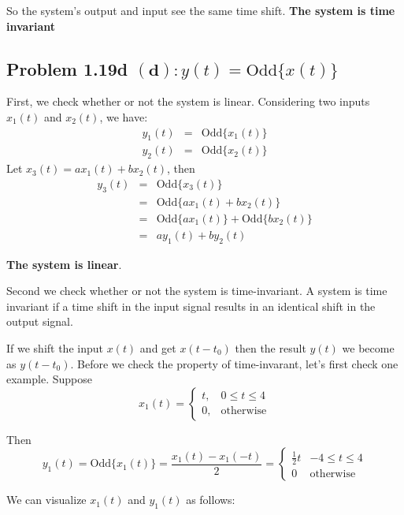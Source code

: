 \documentclass[koma,a4paper,utopia,12pt,listings-color,microtype,paralist,colorlinks,urlcolor=red]{org-article}
\begin{document}
So the system's output and input see the same time shift. \textbf{The system is time
invariant}

\subsection{Problem 1.19d \(\mathbf{(d)}: y(t)= \mathrm{Odd}\{ x(t) \}\)}
\label{sec:org4f05b22}

First, we check whether or not the system is linear. Considering two inputs
\(x_{1}(t)\) and \(x_{2}(t)\), we have:
\begin{eqnarray*}
y_{1}(t)&=& \mathrm{Odd}\{ x_{1}(t) \}  \\
y_{2}(t) &=& \mathrm{Odd} \{ x_{2}(t) \}
\end{eqnarray*}
Let \(x_{3}(t) = ax_{1}(t) + bx_{2}(t)\), then
\begin{eqnarray*}
y_{3}(t)&=& \mathrm{Odd} \{ x_{3}(t) \} \\
&=& \mathrm{Odd} \{ ax_{1}(t) + bx_{2}(t) \} \\
&=& \mathrm{Odd} \{ax_{1}(t) \} + \mathrm{Odd} \{ bx_{2}(t) \} \\
&=& ay_{1}(t) + by_{2}(t)
\end{eqnarray*}

\textbf{The system is linear}.

Second we check whether or not the system is time-invariant. A system is time
invariant if a time shift in the input signal results in an identical shift in
the output signal.

If we shift the input \(x(t)\) and get \(x(t-t_{0})\) then the result \(y(t)\)
we become as \(y(t-t_{0})\). Before we check the property of time-invarant,
let's first check one example. Suppose
\begin{equation*}
x_{1}(t) =
\begin{cases}
t, & 0\leq t \leq 4 \\
0, & \mathrm{otherwise}
\end{cases}
\end{equation*}

Then
\begin{equation*}
y_{1}(t) = \mathrm{Odd}\{x_{1}(t)\} = \frac{x_{1}(t)-x_{1}(-t)}{2} =
\begin{cases}
\frac{1}{2}t & -4 \leq t \leq 4 \\
0  & \mathrm{otherwise}
\end{cases}
\end{equation*}

We can visualize \(x_{1}(t)\) and \(y_{1}(t)\) as follows:
\end{document}
